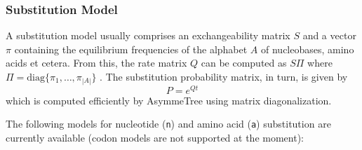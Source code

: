 \documentclass[hidelinks,11pt]{article}
\begin{document}
\subsubsection{Substitution Model}

A substitution model usually comprises an exchangeability matrix $S$ and a vector $\pi$ containing the equilibrium frequencies of the alphabet $A$ of nucleobases, amino acids et cetera.
From this, the rate matrix $Q$ can be computed as $S\Pi$ where $\Pi=\textrm{diag}\{\pi_1,\dots,\pi_{|A|}\}$ \citep{yang2006}.
The substitution probability matrix, in turn, is given by \[P=e^{Qt}\] which is computed efficiently by AsymmeTree using matrix diagonalization.

The following models for nucleotide (\texttt{n}) and amino acid (\texttt{a}) substitution are currently available (codon models are not supported at the moment):
\end{document}
